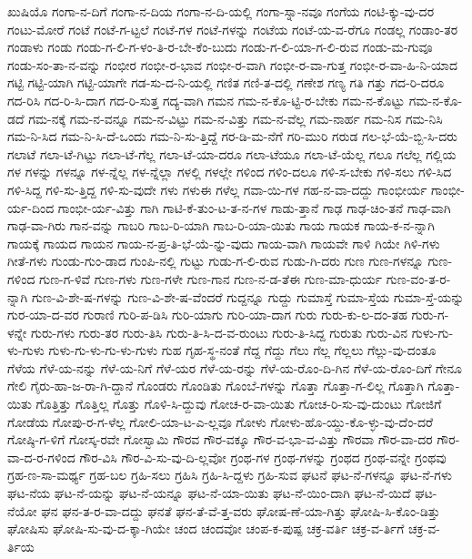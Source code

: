 {ಖುಷಿಯೊ
ಗಂಗಾ-ನ-ದಿಗೆ
ಗಂಗಾ-ನ-ದಿಯ
ಗಂಗಾ-ನ-ದಿ-ಯಲ್ಲಿ
ಗಂಗಾ-ಸ್ನಾ-ನವೂ
ಗಂಗೆಯ
ಗಂಟಿ-ಕ್ಕು-ವು-ದರ
ಗಂಟು-ಮೋರೆ
ಗಂಟೆ
ಗಂಟೆ-ಗ-ಟ್ಟಲೆ
ಗಂಟೆ-ಗಳ
ಗಂಟೆ-ಗಳನ್ನು
ಗಂಟೆಯ
ಗಂಟೆ-ಯ-ವ-ರೆಗೂ
ಗಂಡಲ್ಲ
ಗಂಡಾಂ-ತರ
ಗಂಡಾಳು
ಗಂಡು
ಗಂಡು-ಗ-ಲಿ-ಗ-ಳಂ-ತಿ-ರ-ಬೇ-ಕೆಂ-ಬುದು
ಗಂಡು-ಗ-ಲಿ-ಯಾ-ಗ-ಲಿ-ರುವ
ಗಂಡು-ಮ-ಗುವೂ
ಗಂಡು-ಸಂ-ತಾ-ನ-ವನ್ನು
ಗಂಭೀರ
ಗಂಭೀ-ರ-ಭಾವ
ಗಂಭೀ-ರ-ವಾಗಿ
ಗಂಭೀ-ರ-ವಾ-ಗುತ್ತ
ಗಂಭೀ-ರ-ವಾ-ಹಿ-ನಿ-ಯಾದ
ಗಟ್ಟಿ
ಗಟ್ಟಿ-ಯಾಗಿ
ಗಟ್ಟಿ-ಯಾಗೇ
ಗಡ-ಸು-ದ-ನಿ-ಯಲ್ಲಿ
ಗಣಿತ
ಗಣಿ-ತ-ದಲ್ಲಿ
ಗಣೇಶ
ಗಣ್ಯ
ಗತಿ
ಗತ್ತು
ಗದ-ರಿ-ದರೂ
ಗದ-ರಿಸಿ
ಗದ-ರಿ-ಸಿ-ದಾಗ
ಗದ-ರಿ-ಸುತ್ತ
ಗದ್ಯ-ವಾಗಿ
ಗಮನ
ಗಮ-ನ-ಕೊ-ಟ್ಟಿ-ರ-ಬೇಕು
ಗಮ-ನ-ಕೊಟ್ಟು
ಗಮ-ನ-ಕೊ-ಡದೆ
ಗಮ-ನಕ್ಕೆ
ಗಮ-ನ-ವನ್ನೂ
ಗಮ-ನ-ವಿಟ್ಟು
ಗಮ-ನ-ವಿತ್ತು
ಗಮ-ನ-ವೆಲ್ಲ
ಗಮ-ನಾರ್ಹ
ಗಮ-ನಿಸ
ಗಮ-ನಿಸಿ
ಗಮ-ನಿ-ಸಿದ
ಗಮ-ನಿ-ಸಿ-ದೆ-ಒಂದು
ಗಮ-ನಿ-ಸು-ತ್ತಿದ್ದೆ
ಗರ-ಡಿ-ಮ-ನೆಗೆ
ಗರಿ-ಮುರಿ
ಗರುಡ
ಗಲ-ಭೆ-ಯೆ-ಬ್ಬಿ-ಸಿ-ದರು
ಗಲಾಟೆ
ಗಲಾ-ಟೆ-ಗಿಟ್ಟು
ಗಲಾ-ಟೆ-ಗೆಲ್ಲ
ಗಲಾ-ಟೆ-ಯಾ-ದರೂ
ಗಲಾ-ಟೆಯೂ
ಗಲಾ-ಟೆ-ಯೆಲ್ಲ
ಗಲೂ
ಗಲೆಲ್ಲ
ಗಲ್ಲಿಯ
ಗಳ
ಗಳನ್ನು
ಗಳನ್ನೂ
ಗಳ-ನ್ನೆಲ್ಲ
ಗಳ-ನ್ನೆಲ್ಲಾ
ಗಳಲ್ಲಿ
ಗಳಲ್ಲೇ
ಗಳಿಂದ
ಗಳಿಂ-ದಲೂ
ಗಳಿ-ಸ-ಬೇಕು
ಗಳಿ-ಸಲು
ಗಳಿ-ಸಿದ
ಗಳಿ-ಸಿದ್ದ
ಗಳಿ-ಸು-ತ್ತಿದ್ದ
ಗಳಿ-ಸು-ವುದೇ
ಗಳು
ಗಳುಈ
ಗಳೆಲ್ಲ
ಗವಾ-ಯಿ-ಗಳ
ಗಹ-ನ-ವಾ-ದದ್ದು
ಗಾಂಭೀರ್ಯ
ಗಾಂಭೀ-ರ್ಯ-ದಿಂದ
ಗಾಂಭೀ-ರ್ಯ-ವಿತ್ತು
ಗಾಗಿ
ಗಾಟಿ-ಕೆ-ತುಂ-ಟ-ತ-ನ-ಗಳ
ಗಾಡು-ತ್ತಾನೆ
ಗಾಢ
ಗಾಢ-ಚಿಂ-ತನೆ
ಗಾಢ-ವಾಗಿ
ಗಾಢ-ವಾ-ಗಿರು
ಗಾನ-ವನ್ನು
ಗಾಬರಿ
ಗಾಬ-ರಿ-ಯಾಗಿ
ಗಾಬ-ರಿ-ಯಾ-ಯಿತು
ಗಾಯ
ಗಾಯಕ
ಗಾಯ-ಕ-ನ-ನ್ನಾಗಿ
ಗಾಯಕ್ಕೆ
ಗಾಯದ
ಗಾಯನ
ಗಾಯ-ನ-ಪ್ರ-ತಿ-ಭೆ-ಯೆ-ನ್ನು-ವುದು
ಗಾಯ-ವಾಗಿ
ಗಾಯವೇ
ಗಾಳಿ
ಗಿಯೇ
ಗಿಳಿ-ಗಳು
ಗೀತೆ-ಗಳು
ಗುಂಡು-ಗುಂ-ಡಾದ
ಗುಂಪಿ-ನಲ್ಲಿ
ಗುಟ್ಟು
ಗುಡು-ಗ-ಲಿ-ರುವ
ಗುಡು-ಗಿ-ದರು
ಗುಣ
ಗುಣ-ಗಳನ್ನೂ
ಗುಣ-ಗಳಿಂದ
ಗುಣ-ಗ-ಳಿವೆ
ಗುಣ-ಗಳು
ಗುಣ-ಗಳೇ
ಗುಣ-ಗಾನ
ಗುಣ-ನ-ಡ-ತೆಈ
ಗುಣ-ಮಾ-ಧುರ್ಯ
ಗುಣ-ವಂ-ತ-ರ-ನ್ನಾಗಿ
ಗುಣ-ವಿ-ಶೇ-ಷ-ಗಳನ್ನು
ಗುಣ-ವಿ-ಶೇ-ಷ-ವೆಂದರೆ
ಗುದ್ದನ್ನೂ
ಗುದ್ದು
ಗುಮಾಸ್ತೆ
ಗುಮಾ-ಸ್ತೆಯ
ಗುಮಾ-ಸ್ತೆ-ಯನ್ನು
ಗುರ-ಯಾ-ದ-ವರ
ಗುರಾಣಿ
ಗುರಿ-ಪ-ಡಿಸಿ
ಗುರಿ-ಯಾಗು
ಗುರಿ-ಯಾ-ದಾಗ
ಗುರು
ಗುರು-ಕು-ಲ-ದಂ-ತಹ
ಗುರು-ಗ-ಳನ್ನೇ
ಗುರು-ಗಳು
ಗುರು-ತರ
ಗುರು-ತಿಸಿ
ಗುರು-ತಿ-ಸಿ-ದ-ವ-ರುಂಟು
ಗುರು-ತಿ-ಸಿದ್ದ
ಗುರುತು
ಗುರು-ವಿನ
ಗುಳು-ಗು-ಳು-ಗುಳು
ಗುಳು-ಗು-ಳು-ಗು-ಳು-ಗುಳು
ಗುಹ
ಗೃಹ-ಸ್ಥ-ನಂತೆ
ಗೆದ್ದ
ಗೆದ್ದು
ಗೆಲು
ಗೆಲ್ಲ
ಗೆಲ್ಲಲು
ಗೆಲ್ಲು-ವು-ದಂತೂ
ಗೆಳೆಯ
ಗೆಳೆ-ಯ-ನನ್ನು
ಗೆಳೆ-ಯ-ನಿಗೆ
ಗೆಳೆ-ಯರ
ಗೆಳೆ-ಯ-ರನ್ನು
ಗೆಳೆ-ಯ-ರೊಂ-ದಿ-ಗಿನ
ಗೆಳೆ-ಯ-ರೊಂ-ದಿಗೆ
ಗೇನೂ
ಗೇಲಿ
ಗೈರು-ಹಾ-ಜ-ರಾ-ಗಿ-ದ್ದಾನೆ
ಗೊಂಡರು
ಗೊಂಡಿತು
ಗೊಂಬೆ-ಗಳನ್ನು
ಗೊತ್ತಾ
ಗೊತ್ತಾ-ಗ-ಲಿಲ್ಲ
ಗೊತ್ತಾಗಿ
ಗೊತ್ತಾ-ಯಿತು
ಗೊತ್ತಿತ್ತು
ಗೊತ್ತಿಲ್ಲ
ಗೊತ್ತು
ಗೊಳಿ-ಸಿ-ದ್ದುವು
ಗೋಚ-ರ-ವಾ-ಯಿತು
ಗೋಚ-ರಿ-ಸು-ವು-ದುಂಟು
ಗೋಜಿಗೆ
ಗೋಡೆಯ
ಗೋಪು-ರ-ಗ-ಳೆಲ್ಲ
ಗೋಲಿ-ಯಾ-ಟ-ಎ-ಲ್ಲವೂ
ಗೋಳು
ಗೋಳು-ಹೊ-ಯ್ದು-ಕೊ-ಳ್ಳು-ವು-ದೆಂ-ದರೆ
ಗೋಷ್ಠಿ-ಗ-ಳಿಗೆ
ಗೋಸ್ಕ-ರವೇ
ಗೋಸ್ವಾಮಿ
ಗೌರವ
ಗೌರ-ವಕ್ಕೂ
ಗೌರ-ವ-ಭಾ-ವ-ವಿತ್ತು
ಗೌರವಾ
ಗೌರ-ವಾ-ದರ
ಗೌರ-ವಾ-ದ-ರ-ಗಳಿಂದ
ಗೌರ-ವಿಸಿ
ಗೌರ-ವಿ-ಸು-ವು-ದಿ-ಲ್ಲವೋ
ಗ್ರಂಥ-ಗಳ
ಗ್ರಂಥ-ಗಳನ್ನು
ಗ್ರಂಥದ
ಗ್ರಂಥ-ವನ್ನೇ
ಗ್ರಂಥವು
ಗ್ರಹ-ಣ-ಸಾ-ಮರ್ಥ್ಯ
ಗ್ರಹ-ಬಲ
ಗ್ರಹಿ-ಸಲು
ಗ್ರಹಿಸಿ
ಗ್ರಹಿ-ಸಿ-ದ್ದಳು
ಗ್ರಹಿ-ಸುವ
ಘಟನೆ
ಘಟ-ನೆ-ಗಳನ್ನೂ
ಘಟ-ನೆ-ಗಳು
ಘಟ-ನೆಯ
ಘಟ-ನೆ-ಯನ್ನು
ಘಟ-ನೆ-ಯನ್ನೂ
ಘಟ-ನೆ-ಯಾ-ಯಿತು
ಘಟ-ನೆ-ಯಿಂ-ದಾಗಿ
ಘಟ-ನೆ-ಯಿದೆ
ಘಟ-ನೆಯೋ
ಘನ
ಘನ-ತ-ರ-ವಾ-ದದ್ದು
ಘನತೆ
ಘನ-ತೆ-ವೆ-ತ್ತ-ವರು
ಘೋಷ-ಣೆ-ಯಾ-ಗಿತ್ತು
ಘೋಷಿ-ಸಿ-ಕೊಂ-ಡಿತ್ತು
ಘೋಷಿಸು
ಘೋಷಿ-ಸು-ವು-ದ-ಕ್ಕಾ-ಗಿಯೇ
ಚಂದ
ಚಂದವೋ
ಚಂಪ-ಕ-ಪುಷ್ಪ
ಚಕ್ರ-ವರ್ತಿ
ಚಕ್ರ-ವ-ರ್ತಿಗೆ
ಚಕ್ರ-ವ-ರ್ತಿಯ
}
